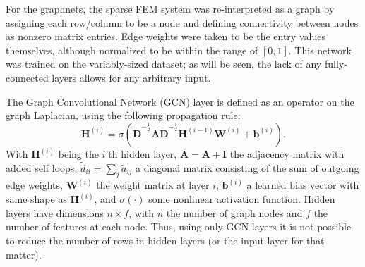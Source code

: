 \documentclass[review]{siamart190516}
\newcommand{\mat}[1]{\bm{{#1}}}
\renewcommand{\vec}[1]{\bm{{#1}}}
\begin{document}
For the graphnets, the sparse FEM system was re-interpreted as a graph by assigning each row/column to be a node and defining connectivity between nodes as nonzero matrix entries.  Edge weights were taken to be the entry values themselves, although normalized to be within the range of $[0, 1]$.   This network was trained on the variably-sized dataset; as will be seen, the lack of any fully-connected layers allows for any arbitrary input.

The Graph Convolutional Network (GCN) layer is defined as an operator on the graph Laplacian, using the following propagation rule:
%
\begin{equation}
  \mat{H}^{\left(i\right)} = \sigma\left( \mat{\tilde{D}}^{-\frac{1}{2}} \mat{\tilde{A}} \mat{\tilde{D}}^{-\frac{1}{2}} \mat{H}^{\left(i-1\right)} \mat{W}^{\left(i\right)} + \vec{b}^{(i)} \right).
\end{equation}
%
With $\mat{H}^{\left(i\right)}$ being the $i$'th hidden layer, $\mat{\tilde{A}} = \mat{A} + \mat{I}$ the adjacency matrix with added self loops, $\tilde{d}_{ii}=\sum_j\tilde{a}_{ij}$ a diagonal matrix consisting of the sum of outgoing edge weights, $\mat{W}^{(i)}$ the weight matrix at layer $i$, $\vec{b}^{(i)}$ a learned bias vector with same shape as $\mat{H}^{(i)}$, and $\sigma\left(\cdot\right)$ some nonlinear activation function.  Hidden layers have dimensions $n \times f$, with $n$ the number of graph nodes and $f$ the number of features at each node.  Thus, using only GCN layers it is not possible to reduce the number of rows in hidden layers (or the input layer for that matter).
\end{document}
